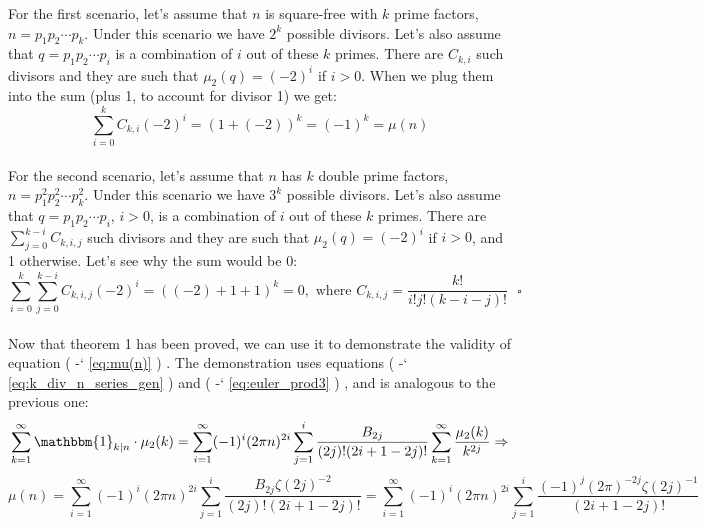 \documentclass[12pt]{article}
\newcommand*{\eqrefe}[1]{%
\begingroup
(\color{BrickRed}
\romannumeral-`\x %
\setcitestyle{numbers}%
\ref{eq:#1}%
\endgroup
)\ignorespacesafterend
}
\begin{document}
For the first scenario, let's assume that $n$ is square-free with $k$ prime factors, $n=p_{1}p_{2}\cdots p_{k}$. Under this scenario we have $2^k$ possible divisors. Let's also assume that $q=p_{1}p_{2}\cdots p_{i}$ is a combination of $i$ out of these $k$ primes. There are $C_{k,i}$ such divisors and they are such that $\mu_{2}(q)=(-2)^i$ if $i>0$. When we plug them into the sum (plus 1, to account for divisor 1) we get:
\begin{equation} 
\sum_{i=0}^{k}C_{k,i}(-2)^i=(1+(-2))^k=(-1)^k=\mu(n) \nonumber
\end{equation}\\
\indent For the second scenario, let's assume that $n$ has $k$ double prime factors, $n=p_{1}^2p_{2}^2\cdots p_{k}^2$. Under this scenario we have $3^k$ possible divisors. Let's also assume that $q=p_{1}p_{2}\cdots p_{i}$, $i>0$, is a combination of $i$ out of these $k$ primes. There are $\sum_{j=0}^{k-i}C_{k,i,j}$ such divisors and they are such that $\mu_{2}(q)=(-2)^i$ if $i>0$, and 1 otherwise.
Let's see why the sum would be 0:
\begin{equation} \nonumber
\sum_{i=0}^{k}\sum_{j=0}^{k-i}C_{k,i,j}(-2)^i =((-2)+1+1)^k=0, \text{ where } C_{k,i,j}=\frac{k!}{i!j!(k-i-j)!} \text{ }\square
\end{equation}\\
\indent Now that theorem 1 has been proved, we can use it to demonstrate the validity of equation \eqrefe{mu(n)}. The demonstration uses equations \eqrefe{k_div_n_series_gen} and \eqrefe{euler_prod3}, and is analogous to the previous one:
\begin{equation} \nonumber
\sum_{k=1}^{\infty}\mathbbm{1}_{k|n}\cdot\mu_2(k)=\sum_{i=1}^{\infty} (-1)^i (2\pi n)^{2i}\sum_{j=1}^{i} \frac{B_{2j}}{(2j)!(2i+1-2j)!}\sum_{k=1}^{\infty}\frac{\mu_2(k)}{k^{2j}} \Rightarrow
\end{equation}
\begin{equation} \nonumber
\mu(n)=\sum_{i=1}^{\infty} (-1)^i (2\pi n)^{2i}\sum_{j=1}^{i} \frac{B_{2j}\zeta(2j)^{-2}}{(2j)!(2i+1-2j)!}=\sum_{i=1}^{\infty} (-1)^i (2\pi n)^{2i}\sum_{j=1}^{i} \frac{(-1)^j(2\pi)^{-2j}\zeta(2j)^{-1}}{(2i+1-2j)!}
\end{equation} 
\end{document}
